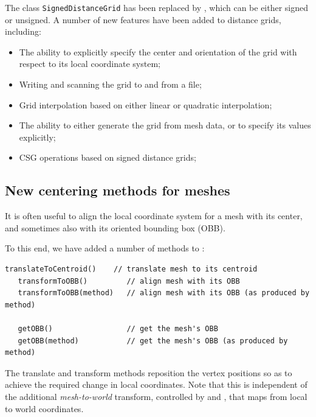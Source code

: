 \documentclass{article}
\begin{document}
The class {\tt SignedDistanceGrid} has been replaced by
, which can be either signed
or unsigned. A number of new features have been added to distance
grids, including:

\begin{itemize}

\item The ability to explicitly specify the center and orientation of
the grid with respect to its local coordinate system;

\item Writing and scanning the grid to and from a file;

\item Grid interpolation based on either linear or quadratic interpolation;

\item The ability to either generate the grid from mesh data, or to
specify its values explicitly;

\item CSG operations based on signed distance grids;

\end{itemize}

\subsection*{New centering methods for meshes}

It is often useful to align the local coordinate system for a mesh
with its center, and sometimes also with its oriented
bounding box (OBB).

To this end, we have added a number of methods to 
:
%
\begin{lstlisting}[]
   translateToCentroid()    // translate mesh to its centroid
   transformToOBB()         // align mesh with its OBB 
   transformToOBB(method)   // align mesh with its OBB (as produced by method)

   getOBB()                 // get the mesh's OBB
   getOBB(method)           // get the mesh's OBB (as produced by method)
\end{lstlisting}
%
The translate and transform methods reposition the vertex positions so
as to achieve the required change in local coordinates. Note that this
is independent of the additional {\it mesh-to-world} transform,
controlled by 
and , that
maps from local to world coordinates.
\end{document}
